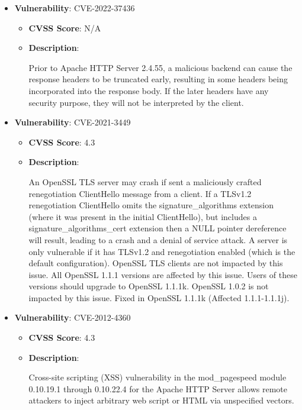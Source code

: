 \documentclass{article}
\begin{document}
\begin{itemize}
        \item \textbf{Vulnerability}: CVE-2022-37436
        \begin{itemize}
            \item \textbf{CVSS Score}:  N/A 
            \item \textbf{Description}:
            \parbox[t]{0.9\linewidth}{
                \ttfamily Prior to Apache HTTP Server 2.4.55, a malicious backend can cause the response headers to be truncated early, resulting in some headers being incorporated into the response body. If the later headers have any security purpose, they will not be interpreted by the client.
            }
        \end{itemize}
    
        \item \textbf{Vulnerability}: CVE-2021-3449
        \begin{itemize}
            \item \textbf{CVSS Score}:  4.3 
            \item \textbf{Description}:
            \parbox[t]{0.9\linewidth}{
                \ttfamily An OpenSSL TLS server may crash if sent a maliciously crafted renegotiation ClientHello message from a client. If a TLSv1.2 renegotiation ClientHello omits the signature\_algorithms extension (where it was present in the initial ClientHello), but includes a signature\_algorithms\_cert extension then a NULL pointer dereference will result, leading to a crash and a denial of service attack. A server is only vulnerable if it has TLSv1.2 and renegotiation enabled (which is the default configuration). OpenSSL TLS clients are not impacted by this issue. All OpenSSL 1.1.1 versions are affected by this issue. Users of these versions should upgrade to OpenSSL 1.1.1k. OpenSSL 1.0.2 is not impacted by this issue. Fixed in OpenSSL 1.1.1k (Affected 1.1.1-1.1.1j).
            }
        \end{itemize}
    
        \item \textbf{Vulnerability}: CVE-2012-4360
        \begin{itemize}
            \item \textbf{CVSS Score}:  4.3 
            \item \textbf{Description}:
            \parbox[t]{0.9\linewidth}{
                \ttfamily Cross-site scripting (XSS) vulnerability in the mod\_pagespeed module 0.10.19.1 through 0.10.22.4 for the Apache HTTP Server allows remote attackers to inject arbitrary web script or HTML via unspecified vectors.
            }
        \end{itemize}
    

\end{itemize}
\end{document}
